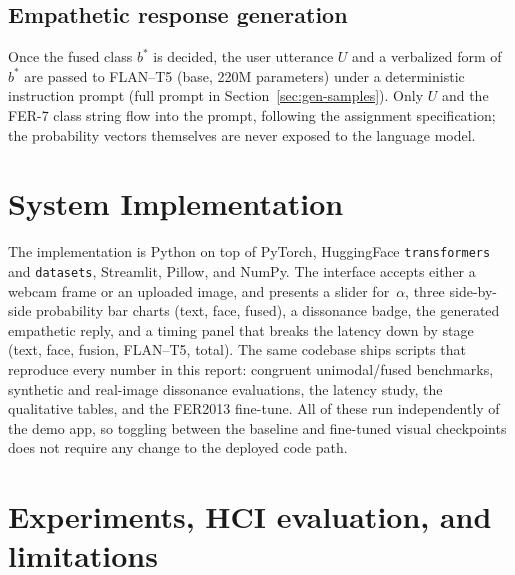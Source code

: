 \documentclass[sigconf,nonacm]{acmart}
\begin{document}
\subsection{Empathetic response generation}
Once the fused class $b^{*}$ is decided, the user utterance $U$ and a verbalized form of $b^{*}$ are passed to FLAN--T5 (base, 220M parameters) under a deterministic instruction prompt (full prompt in Section~\ref{sec:gen-samples}). Only $U$ and the FER-7 class string flow into the prompt, following the assignment specification; the probability vectors themselves are never exposed to the language model.

\section{System Implementation}\label{sec:Implementation}
The implementation is Python on top of PyTorch, HuggingFace \texttt{transformers} and \texttt{datasets}, Streamlit, Pillow, and NumPy. The interface accepts either a webcam frame or an uploaded image, and presents a slider for~$\alpha$, three side-by-side probability bar charts (text, face, fused), a dissonance badge, the generated empathetic reply, and a timing panel that breaks the latency down by stage (text, face, fusion, FLAN--T5, total). The same codebase ships scripts that reproduce every number in this report: congruent unimodal/fused benchmarks, synthetic and real-image dissonance evaluations, the latency study, the qualitative tables, and the FER2013 fine-tune. All of these run independently of the demo app, so toggling between the baseline and fine-tuned visual checkpoints does not require any change to the deployed code path.

\section{Experiments, HCI evaluation, and limitations}
\end{document}
